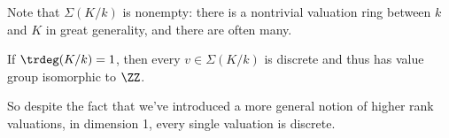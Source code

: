 \begin{remark}

Note that \(\Sigma(K/k)\) is nonempty: there is a nontrivial valuation
ring between \(k\) and \(K\) in great generality, and there are often
many.

\end{remark}

\begin{claim}[Key]

If \(\trdeg(K/k) = 1\), then every \(v\in \Sigma(K/k)\) is discrete and
thus has value group isomorphic to \(\ZZ\).

\end{claim}

So despite the fact that we've introduced a more general notion of
higher rank valuations, in dimension 1, every single valuation is
discrete.

